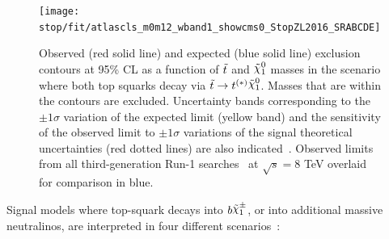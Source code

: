 			\begin{figure}[htpb]
			  \begin{center} \texttt{[image: stop/fit/atlascls\_m0m12\_wband1\_showcms0\_StopZL2016\_SRABCDE]}
			    \caption{Observed (red solid line) and expected (blue solid line)
			      exclusion contours at 95\% CL as a function of $\tilde{t}$ and
			      $\ninoone$ masses in the scenario where both top squarks decay
			      via $\stop\to t^{(*)} \ninoone$. Masses that are within the contours are excluded. Uncertainty bands corresponding to the $\pm 1
			      \sigma$ variation of the expected limit (yellow band) and the
			      sensitivity of the observed limit to $\pm 1\sigma$ variations of
			      the signal theoretical uncertainties (red dotted lines) are also
			      indicated~\cite{stop0L}. Observed limits from all third-generation Run-1 searches~\cite{Atlas8TeVSummary} at $\sqrt{s}=8$ TeV overlaid for comparison in blue.}
			    \label{fig:SRABC_exclusion}
			  \end{center}
			\end{figure}

			Signal models where top-squark decays into $b \chinoonepm$, or into additional massive neutralinos, are interpreted in four different scenarios~\cite{stop0L}:

